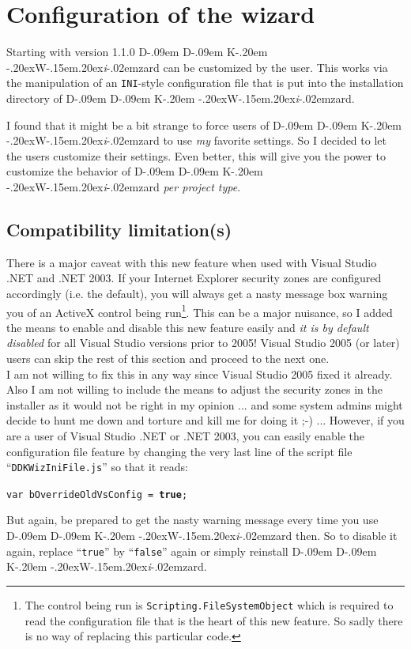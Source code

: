 \documentclass[a4paper,titlepage]{report}
\def\ddkwiz{D\kern-.09em D\kern-.09em K\kern-.20em \raise-.20ex\hbox{W}\kern-.15em\raise.20ex\hbox{\it{i}}\kern-.02em{zard}}
\begin{document}
\chapter{Configuration of the wizard}\thispagestyle{fancy}
Starting with version 1.1.0 \ddkwiz{} can be customized by the user. This works
via the manipulation of an \texttt{INI}-style configuration file that is put into the
installation directory of \ddkwiz{}.

I found that it might be a bit strange to force users of \ddkwiz{} to use \emph{my}
favorite settings. So I decided to let the users customize their settings. Even better,
this will give you the power to customize the behavior of \ddkwiz{} \emph{per project
type}.

\section{Compatibility limitation(s)}
\label{compat:activex}
There is a major caveat with this new feature when used with
Visual Studio .NET and .NET 2003. If your Internet Explorer security zones
are configured accordingly (i.e. the default), you will always get a nasty message box
warning you of an ActiveX control being run\footnote{The control being run is
\texttt{Scripting.FileSystemObject} which is required to read the configuration
file that is the heart of this new feature. So sadly there is no way of
replacing this particular code.}. This can be a major nuisance, so I
added the means to enable and disable this new feature easily and \emph{it is by default
disabled} for all Visual Studio versions prior to 2005! Visual Studio 2005 (or later)
users can skip the rest of this section and proceed to the next one.\\

I am not willing to fix this in any way since Visual Studio 2005 fixed it already.
Also I am not willing to include the means to adjust the security zones in
the installer as it would not be right in my opinion ... and some system admins
might decide to hunt me down and torture and kill me for doing it \textsf{;-)} ...
However, if you are a user of Visual Studio .NET or .NET 2003, you can easily
enable the configuration file feature by changing the very last line of the
script file ``\texttt{DDKWizIniFile.js}'' so that it reads:

\texttt{var bOverrideOldVsConfig = \textbf{true};}

But again, be prepared to get the nasty warning message every time you use \ddkwiz{}
then. So to disable it again, replace ``\texttt{true}'' by ``\texttt{false}'' again
or simply reinstall \ddkwiz{}.\\
\end{document}
